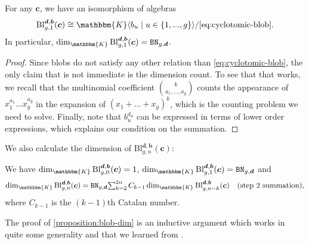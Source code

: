 \documentclass[a4paper,11pt]{amsart}
\renewcommand{\dots}{\text{...}}
\newcommand{\setstuff}[1]{\mathrm{#1}}
\newcommand{\KK}{\mathbbm{K}}
\newcommand{\bsym}[1]{\boldsymbol{#1}}
\newcommand{\varsym}[1]{\mathtt{#1}}
\newcommand{\cpar}{\bsym{c}}
\newcommand{\bpar}{\bsym{b}}
\newcommand{\dpar}{\bsym{d}}
\newcommand{\bbvar}{\varsym{BN}}
\numberwithin{equation}{section}
\let\fullref\autoref
\begin{document}
\begin{lemma}\label{lemma:blob-onestrand}
For any $\cpar$, we have an isomorphism of algebras
\begin{gather*}
\setstuff{Bl}_{g,1}^{\dpar,\bpar}(\cpar)
\cong
\KK\langle b_{u}\mid u\in\{1,\dots,g\}\rangle
/\eqref{eq:cyclotomic-blob}
.
\end{gather*}
In particular, 
$\dim_{\KK}\setstuff{Bl}_{g,1}^{\dpar,\bpar}(\cpar)=\bbvar_{g,\dpar}$.
\end{lemma}

\begin{proof}
Since blobs do not satisfy any other relation than \eqref{eq:cyclotomic-blob},
the only claim that is not immediate is the dimension count. 
To see that that works, we recall that the multinomial coefficient 
$\binom{k}{a_{1},\dots,a_{g}}$
counts the appearance of $x^{a_{1}}_{1}\dots x^{a_{g}}_{g}$ in the expansion 
of $(x_{1}+\dots+x_{g})^{k}$, which is the counting problem we need to solve.
Finally, note that $b_{u}^{d_{u}}$ can be expressed in terms of
lower order expressions, which explains our condition on the summation.
\end{proof}

We also calculate the dimension of 
$\setstuff{Bl}_{g,n}^{\dpar,\bpar}(\cpar)$:

\begin{proposition}\label{proposition:blob-dim}
We have $\dim_{\KK}\setstuff{Bl}_{g,0}^{\dpar,\bpar}(\cpar)=1$, 
$\dim_{\KK}\setstuff{Bl}_{g,1}^{\dpar,\bpar}(\cpar)=\bbvar_{g,\dpar}$ and
\begin{gather}\label{eq:blob-dim}
\dim_{\KK}\setstuff{Bl}_{g,n}^{\dpar,\bpar}(\cpar)
=
\bbvar_{g,\dpar}
{\textstyle\sum_{k=2}^{2n}}\,C_{k-1}\dim_{\KK}
\setstuff{Bl}_{g,n-k}^{\dpar,\bpar}(\cpar)
\quad\text{(step $2$ summation)},
\end{gather}
where $C_{k-1}$ is the $(k-1)$th Catalan number.
\end{proposition}

The proof of \fullref{proposition:blob-dim} 
is an inductive argument which works in quite some 
generality and that we learned from \cite{tDi-sym-bridges}.
\end{document}
